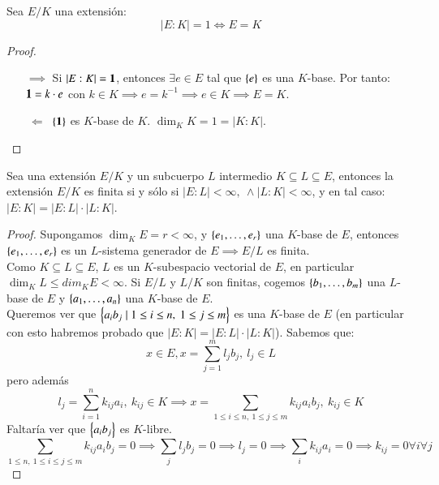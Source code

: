 \begin{lm}
    Sea $E/K$ una extensión:
    $$
        |E:K| = 1 \iff E = K
    $$
\end{lm}

\begin{proof}$ $
    \begin{itemize}
        \item[$\implies$] Si $|E:K| = \mathbf{1}$, entonces $\exists e \in E$ tal que $\left\{e\right\}$ es una $K$-base. Por tanto: $\mathbf{1} = k \cdot e$ con $k \in K \implies e = k^{-1} \implies e \in K \implies E = K$.
        \item[$\ \Longleftarrow \ $] $\left\{\mathbf{1}\right\}$ es $K$-base de $K$. $\dim_K K = 1 = |K:K|$.
    \end{itemize}
\end{proof}

\begin{thm}\label{thm:transgr} %
    Sea una extensión $E/K$ y un subcuerpo $L$ intermedio $K \subseteq L \subseteq E$, entonces la extensión $E/K$ es finita si y sólo si $|E:L| < \infty,\ \land |L:K| < \infty$, y en tal caso: $|E:K| = |E:L|\cdot |L:K|$.
\end{thm}

\begin{proof}
    Supongamos $\dim_K E = r < \infty$, y $\left\{e_1, \ldots, e_r\right\}$ una $K$-base de $E$, entonces $\left\{e_1, \ldots, e_r\right\}$ es un $L$-sistema generador de $E \implies E/L$ es finita.\\
    Como $K \subseteq L \subseteq E$, $L$ es un $K$-subespacio vectorial de $E$, en particular $\dim_K L \leq dim_K E < \infty$. Si $E/L$ y $L/K$ son finitas, cogemos $\left\{b_1, \ldots, b_m\right\}$ una $L$-base de $E$ y $\left\{a_1, \ldots, a_n\right\}$ una $K$-base de $E$.\\
    Queremos ver que $\left\{a_ib_j \mid 1 \leq i \leq n,\ 1 \leq j \leq m\right\}$ es una $K$-base de $E$ (en particular con esto habremos probado que $|E:K| = |E:L|\cdot |L:K|$). Sabemos que:
    $$
        x \in E, x = \sum_{j=1}^m l_j b_j,\ l_j \in L
    $$
    pero además
    $$
        l_j = \sum_{i = 1}^{n} k_{ij} a_i,\ k_{ij} \in K \implies x = \sum_{1 \leq i \leq n,\ 1 \leq j \leq m} k_{ij}a_ib_j,\ k_{ij} \in K
    $$
    Faltaría ver que $\left\{a_ib_j\right\}$ es $K$-libre.
    $$
        \sum_{1 \leq n,\ 1 \leq i\leq j \leq m} k_{ij}a_ib_j = 0 \implies \sum_j l_j b_j = 0 \implies l_j = 0 \implies \sum_i k_{ij}a_i = 0 \implies k_{ij} = 0 \forall i \forall j
    $$
\end{proof}

